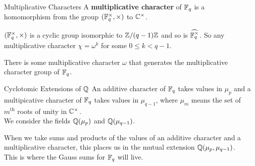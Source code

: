 \documentclass[presentation]{beamer}
\begin{document}
\begin{frame}{Multiplicative Characters}
A \textbf{multiplicative character} of $\mathbb{F}_q$ is a homomorphism from the group $(\mathbb{F}_q^\times, \times)$ to $\mathbb{C}^\times$. 
\\

\pause
\vspace{0.5cm}

$(\mathbb{F}_q^\times, \times)$ is a cyclic group isomorphic to $\mathbb{Z}/(q - 1)\mathbb{Z}$ and so is $\widehat{\mathbb{F}_q^\times}$. So any multiplicative character $\chi = \omega^k$ for some $0 \leq k < q-1$.
\\

\pause
\vspace{0.5cm}

There is some multiplicative character $\omega$ that generates the multiplicative character group of $\mathbb{F}_q$.

\end{frame}

\begin{frame}{Cyclotomic Extensions of $\mathbb{Q}$}
An additive character of $\mathbb{F}_q$ takes values in $\mu_p$ and a multipicative character of $\mathbb{F}_q$ takes values in $\mu_{q-1}$, where $\mu_m$ means the set of $m^\text{th}$ roots of unity in $\mathbb{C}^\times$.\\

We consider the fields $\mathbb{Q}(\mu_p)$ and $\mathbb{Q}(\mu_{q-1})$.
\\
\pause 
\vspace{0.5cm}

When we take sums and products of the values of an additive character and a multiplicative character, this places us in the mutual extension $\mathbb{Q}(\mu_p, \mu_{q-1})$. 
\\
\pause
\vspace{0.5cm}
This is where the Gauss sums for $\mathbb{F}_q$ will live.


\end{frame}
\end{document}
